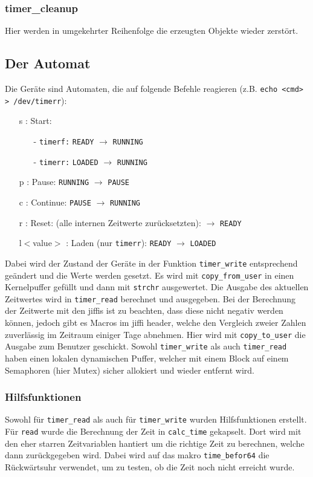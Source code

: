 \documentclass[
   draft=false
  ,paper=a4
  ,twoside=false
  ,fontsize=11pt
  ,headsepline
  ,BCOR10mm
  ,DIV11
  ,parskip=full+
]{scrartcl} %
\begin{document}
\subsubsection{timer\_cleanup}
    Hier werden in umgekehrter Reihenfolge die erzeugten Objekte wieder
    zerstört.

\subsection{Der Automat}
Die Geräte sind Automaten, die auf folgende Befehle reagieren
(z.B. \texttt{echo <cmd> > /dev/timerr}):
\begin{enumerate}
    \item[s :] Start:
        \begin{enumerate}
            \item[-] \texttt{timerf:} \texttt{READY}  $\to$ \texttt{RUNNING}
            \item[-] \texttt{timerr:} \texttt{LOADED} $\to$ \texttt{RUNNING}
        \end{enumerate}
    \item[p :] Pause: \texttt{RUNNING} $\to$ \texttt{PAUSE}
    \item[c :] Continue: \texttt{PAUSE} $\to$ \texttt{RUNNING}
    \item[r :] Reset: (alle internen Zeitwerte zurücksetzten):
        $\to$ \texttt{READY}
    \item[l$<$value$>$ :] Laden (nur \texttt{timerr}):
        \texttt{READY} $\to$ \texttt{LOADED}
\end{enumerate}
Dabei wird der Zustand der Geräte in der Funktion \texttt{timer\_write}
entsprechend geändert und die Werte werden gesetzt. Es wird mit
 \texttt{copy\_from\_user} in einen Kernelpuffer
gefüllt und dann mit \texttt{strchr}
ausgewertet.
Die Ausgabe des aktuellen Zeitwertes wird in \texttt{timer\_read} berechnet
und ausgegeben. Bei der Berechnung der Zeitwerte mit den jiffis ist zu
beachten, dass diese nicht negativ werden können, jedoch gibt es Macros im
jiffi header, welche den Vergleich zweier Zahlen zuverlässig im Zeitraum
einiger Tage abnehmen. Hier wird mit
\texttt{copy\_to\_user} die Ausgabe zum Benutzer geschickt. Sowohl
\texttt{timer\_write} als auch \texttt{timer\_read} haben einen lokalen
dynamischen Puffer, welcher mit einem Block auf einem Semaphoren (hier Mutex)
sicher allokiert und wieder entfernt wird.

\subsubsection{Hilfsfunktionen}
Sowohl für \texttt{timer\_read} als auch für \texttt{timer\_write} wurden
Hilfsfunktionen erstellt. Für \texttt{read} wurde die Berechnung der Zeit in
\texttt{calc\_time} gekapselt. Dort wird mit den eher starren Zeitvariablen
hantiert um die richtige Zeit zu berechnen, welche dann zurückgegeben wird.
Dabei wird auf das makro \texttt{time\_befor64} die Rückwärtsuhr verwendet,
um zu testen, ob die Zeit noch nicht erreicht wurde.
\end{document}

